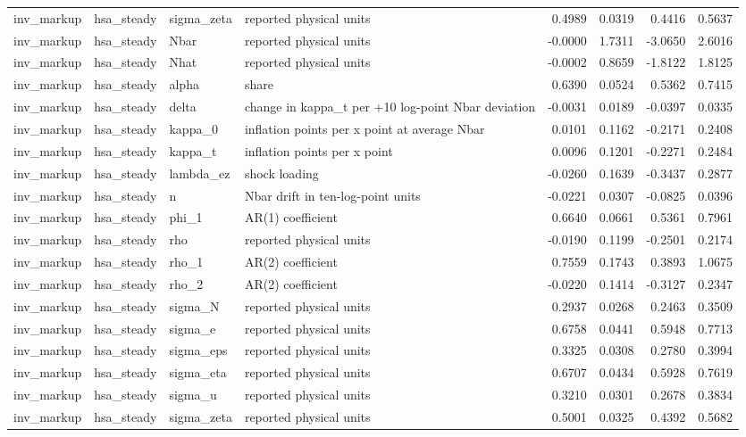 \begin{tabular}{llllrrrr}
inv\_markup & hsa\_steady & sigma\_zeta & reported physical units & 0.4989 & 0.0319 & 0.4416 & 0.5637 \\
inv\_markup & hsa\_steady & Nbar & reported physical units & -0.0000 & 1.7311 & -3.0650 & 2.6016 \\
inv\_markup & hsa\_steady & Nhat & reported physical units & -0.0002 & 0.8659 & -1.8122 & 1.8125 \\
inv\_markup & hsa\_steady & alpha & share & 0.6390 & 0.0524 & 0.5362 & 0.7415 \\
inv\_markup & hsa\_steady & delta & change in kappa\_t per +10 log-point Nbar deviation & -0.0031 & 0.0189 & -0.0397 & 0.0335 \\
inv\_markup & hsa\_steady & kappa\_0 & inflation points per x point at average Nbar & 0.0101 & 0.1162 & -0.2171 & 0.2408 \\
inv\_markup & hsa\_steady & kappa\_t & inflation points per x point & 0.0096 & 0.1201 & -0.2271 & 0.2484 \\
inv\_markup & hsa\_steady & lambda\_ez & shock loading & -0.0260 & 0.1639 & -0.3437 & 0.2877 \\
inv\_markup & hsa\_steady & n & Nbar drift in ten-log-point units & -0.0221 & 0.0307 & -0.0825 & 0.0396 \\
inv\_markup & hsa\_steady & phi\_1 & AR(1) coefficient & 0.6640 & 0.0661 & 0.5361 & 0.7961 \\
inv\_markup & hsa\_steady & rho & reported physical units & -0.0190 & 0.1199 & -0.2501 & 0.2174 \\
inv\_markup & hsa\_steady & rho\_1 & AR(2) coefficient & 0.7559 & 0.1743 & 0.3893 & 1.0675 \\
inv\_markup & hsa\_steady & rho\_2 & AR(2) coefficient & -0.0220 & 0.1414 & -0.3127 & 0.2347 \\
inv\_markup & hsa\_steady & sigma\_N & reported physical units & 0.2937 & 0.0268 & 0.2463 & 0.3509 \\
inv\_markup & hsa\_steady & sigma\_e & reported physical units & 0.6758 & 0.0441 & 0.5948 & 0.7713 \\
inv\_markup & hsa\_steady & sigma\_eps & reported physical units & 0.3325 & 0.0308 & 0.2780 & 0.3994 \\
inv\_markup & hsa\_steady & sigma\_eta & reported physical units & 0.6707 & 0.0434 & 0.5928 & 0.7619 \\
inv\_markup & hsa\_steady & sigma\_u & reported physical units & 0.3210 & 0.0301 & 0.2678 & 0.3834 \\
inv\_markup & hsa\_steady & sigma\_zeta & reported physical units & 0.5001 & 0.0325 & 0.4392 & 0.5682 \\

\end{tabular}
